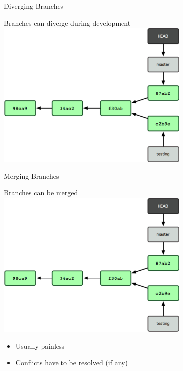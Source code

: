 \documentclass[10pt,xcolor=dvipsnames]{beamer}
\begin{document}
\begin{frame}{Diverging Branches}
\begin{center}
Branches can diverge during development
\includegraphics[width = 0.7\textwidth]{branch2.png}
\end{center}
\end{frame}

\begin{frame}{Merging Branches}
\begin{center}
Branches can be merged
\includegraphics[width = 0.7\textwidth]{branch2.png}
\end{center}
\begin{itemize}
\item Usually painless
\item Conflicts have to be resolved (if any)
\end{itemize}
\end{frame}
\end{document}
